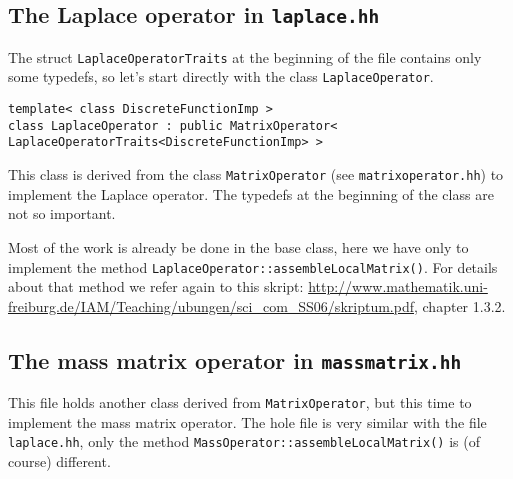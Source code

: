 \subsection{The Laplace operator in \texttt{laplace.hh} }
The struct \texttt{LaplaceOperatorTraits} at the beginning of the file contains only some typedefs,
so let's start directly with the  class \texttt{LaplaceOperator}.
\begin{lstlisting}
template< class DiscreteFunctionImp >
class LaplaceOperator : public MatrixOperator< LaplaceOperatorTraits<DiscreteFunctionImp> >
\end{lstlisting}
This class is derived from the class \texttt{MatrixOperator} (see \texttt{matrixoperator.hh}) to implement the Laplace operator.
The typedefs at the beginning of the class are not so important.

Most of the work is already be done in the base class, here we have only to implement the method \texttt{LaplaceOperator::assembleLocalMatrix()}. For details about that method we refer again to
this skript: \url{http://www.mathematik.uni-freiburg.de/IAM/Teaching/ubungen/sci_com_SS06/skriptum.pdf}, chapter 1.3.2.



\subsection{The mass matrix operator in \texttt{massmatrix.hh} }

This file holds another class derived from \texttt{MatrixOperator}, but this time to implement the mass matrix operator.
The hole file is very similar with the file \texttt{laplace.hh}, only the method \texttt{MassOperator::assembleLocalMatrix()}
is (of course) different.















